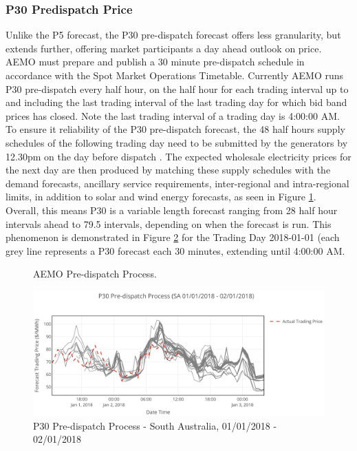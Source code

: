 \subsubsection{P30 Predispatch Price}
Unlike the P5 forecast, the P30 pre-dispatch forecast offers less granularity, but extends further, offering market participants a day ahead outlook on price. AEMO must prepare and publish a 30 minute pre-dispatch schedule in accordance with the Spot Market Operations Timetable. Currently AEMO runs P30 pre-dispatch every
half hour, on the half hour for each trading interval up to and including the last trading interval of the last trading day for which bid band prices has closed. Note the last trading interval of a trading day is 4:00:00 AM. To ensure it reliability of the P30 pre-dispatch forecast, the 48 half hours supply schedules of the following trading day need to be submitted by the generators by 12.30pm on the day before dispatch \parencite{Predispatch}. The expected wholesale electricity prices for the next day are then produced by matching these supply schedules with the demand forecasts, ancillary service requirements, inter-regional and intra-regional limits, in addition to solar and wind energy forecasts, as seen in Figure \ref{diagram:predispatch_process}. Overall, this means P30 is a variable length forecast ranging from 28 half hour intervals ahead to 79.5 intervals, depending on when the forecast is run. This phenomenon is demonstrated in Figure \ref{fig:p30_process_2} for the Trading Day 2018-01-01 (each grey line represents a P30 forecast each 30 minutes, extending until 4:00:00 AM.
\begin{figure}[h]
\centering

\caption{AEMO Pre-dispatch Process.}
\label{diagram:predispatch_process}
\end{figure}
\begin{figure}[]
\centering
\includegraphics[width=1\textwidth]{Pictures/Chapter2/P30_Process_2.png}
\caption{P30 Pre-dispatch Process - South Australia, 01/01/2018 - 02/01/2018}
\label{fig:p30_process_2}
\end{figure}
